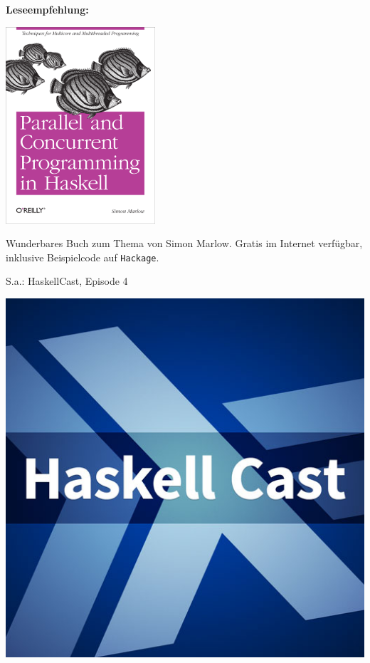 \documentclass{beamer}
\begin{document}
\begin{frame}[fragile]

\Large
\textbf{Leseempfehlung:}
\normalsize

\begin{multicols}{2}
\includegraphics[scale=0.45]{parcur.png} 
\columnbreak

Wunderbares Buch zum Thema von Simon Marlow. Gratis im Internet verfügbar, inklusive Beispielcode auf \texttt{Hackage}.\pause\smallskip\smallskip

S.a.: HaskellCast, Episode 4
\begin{center}
\includegraphics[scale=0.14]{haskellcast-logo.jpg} 
\end{center}
\end{multicols}

\end{frame}
\end{document}
